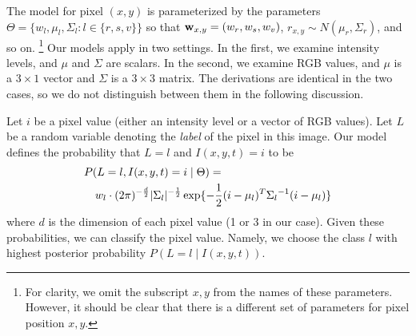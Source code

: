 
The model for pixel $(x,y)$ is parameterized by the parameters $\Theta
= \{
w_l, \mu_l, \Sigma_l : l \in \{ r, s, v \}\}$ so that $\mbox{{\bf w}}_{x,y} = (w_r,
w_s, w_v )$, $r_{x,y} \sim N(\mu_r,\Sigma_r)$, and so on.%
\footnote{For clarity, we omit the subscript $x,y$ from the names of
these parameters. However, it should be clear that there is a
different set of parameters for pixel position $x,y$.}
Our models apply in two settings. In the first, we examine intensity
levels, and $\mu$ and $\Sigma$ are scalars. In the second, we examine
RGB values, and $\mu$ is a $3\times 1$ vector and $\Sigma$ is a $3\times 3$
matrix. The derivations are identical in the two cases, so we do not
distinguish between them in the following discussion.

Let $i$ be a pixel value (either an intensity level or a vector of RGB
values). Let $L$ be a random variable denoting the {\em label\/} of
the pixel in this image. Our model defines the probability that $L =
l$ and $I(x,y,t) = i$ to be
\begin{eqnarray*}
\lefteqn{P( L = l, I(x,y,t) = i \mid \Theta ) = {}} \\
 & &  w_l \cdot
(2\pi)^{-\frac{d}{2}}|\Sigma_l|^{-\frac{1}{2}} \exp\{-\frac{1}{2}(i -
\mu_l)^T {\Sigma_l}^{-1} (i - \mu_l)\}
\end{eqnarray*}
where $d$ is the dimension of each pixel value (1 or 3 in our case).
Given these probabilities, we can classify the pixel value. Namely, we
choose the class $l$ with highest posterior  probability $P( L = l \mid I(x,y,t)) $.



